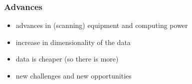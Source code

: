 \documentclass{beamer}
\begin{document}
\begin{frame}
	\frametitle{Advances}
		\begin{itemize}
			\item advances in (scanning) equipment and computing power
			\item increase in dimensionality of the data
			\item data is cheaper (so there is more)
			\item new challenges and new opportunities
		\end{itemize}
\end{frame}



\end{document}
